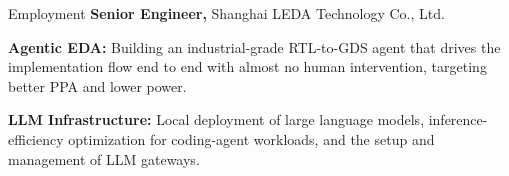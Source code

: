
\begin{rubric}{Employment}
	\textbf{Senior Engineer,} Shanghai LEDA Technology Co., Ltd.
	\par \textbf{Agentic EDA:} Building an industrial-grade RTL-to-GDS agent that drives the implementation flow end to end with almost no human intervention, targeting better PPA and lower power.
	\par \textbf{LLM Infrastructure:} Local deployment of large language models, inference-efficiency optimization for coding-agent workloads, and the setup and management of LLM gateways.
\end{rubric}
